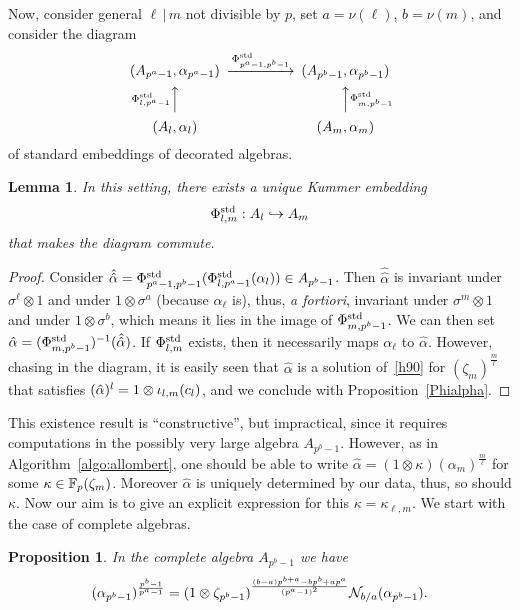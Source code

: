 \documentclass[sigconf]{acmart}
\newtheorem{proposition}[theorem]{Proposition}
\newtheorem{lemma}[theorem]{Lemma}
\begin{document}
Now, consider general $\ell\,|\,m$ not divisible by $p$,
set $a=\nu(\ell)$, $b=\nu(m)$, and consider the diagram
\begin{equation*}
\label{3cotes}
\begin{CD}
(A_{p^a-1},\alpha_{p^a-1}) @>{\embedalg{p^a-1}{p^b-1}}>> (A_{p^b-1},\alpha_{p^b-1}) \\
@A{\embedalg{\ell}{p^a-1}}AA @AA{\embedalg{m}{p^b-1}}A\\
(A_\ell,\alpha_\ell) @. (A_m,\alpha_m)
\end{CD}
\end{equation*}
of standard embeddings of decorated algebras.
\begin{lemma}
In this setting, there exists a unique Kummer embedding
\[ {\Phi^{\mathrm{std}}_{{l},{m}}}:A_l\hookrightarrow A_m \]
that makes the diagram commute.
\end{lemma}
\begin{proof}
Consider $\hat{\hat\alpha}={\Phi^{\mathrm{std}}_{{p^a-1},{p^b-1}}}({\Phi^{\mathrm{std}}_{{l},{p^a-1}}}(\alpha_l))\in A_{p^b-1}$.
Then $\hat{\hat\alpha}$ is invariant under $\sigma^\ell\otimes1$ and
under $1\otimes\sigma^a$ (because $\alpha_\ell$ is),
thus, \textit{a fortiori}, invariant under $\sigma^m\otimes1$ and
under $1\otimes\sigma^b$, which means it lies in the image
of ${\Phi^{\mathrm{std}}_{{m},{p^b-1}}}$.
We can then set $\hat\alpha=({\Phi^{\mathrm{std}}_{{m},{p^b-1}}})^{-1}(\hat{\hat\alpha})$.
If ${\Phi^{\mathrm{std}}_{{l},{m}}}$ exists, then it necessarily maps $\alpha_\ell$
to $\hat\alpha$.
However, chasing in the diagram, it is easily seen that $\hat\alpha$ is
a solution of~\eqref{h90} for $(\zeta_m)^{\frac{m}{\ell}}$ that
satisfies $(\hat{\alpha})^l=1\otimes{\iota_{{l},{m}}}(c_l)$,
and we conclude with Proposition~\ref{Phialpha}.
\end{proof}
This existence result is ``constructive'', but impractical,
since it requires computations in the possibly very large algebra $A_{p^b-1}$.
However, as in Algorithm~\ref{algo:allombert}, one should be able
to write $\hat{\alpha}=(1\otimes\kappa)(\alpha_m)^{\frac{m}{\ell}}$
for some $\kappa\in\mathbb{F}_{p}(\zeta_m)$. Moreover $\hat{\alpha}$ is uniquely
determined by our data, thus, so should $\kappa$.
Now our aim is to give an explicit expression for this $\kappa=\kappa_{\ell,m}$.
We start with the case of complete algebras.
\begin{proposition}
\label{key}
In the complete algebra $A_{p^b-1}$ we have
\[ (\alpha_{p^b-1})^{\frac{p^b-1}{p^a-1}}=(1\otimes\zeta_{p^b-1})^{\frac{(b-a)p^{b+a}-bp^b+ap^a}{(p^a-1)^2}}\mathcal{N}_{b/a}(\alpha_{p^b-1}).\]
\end{proposition}
\end{document}
